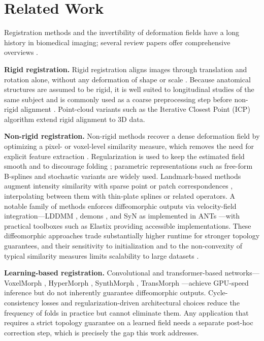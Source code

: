 \section{Related Work}
\label{sec:related_work}

Registration methods and the invertibility of deformation fields \cite{Dupuis1998} have a long history in biomedical imaging; several review papers offer comprehensive overviews \cite{KLEIN2009786}.

\textbf{Rigid registration.}
Rigid registration aligns images through translation and rotation alone, without any deformation of shape or scale \cite{Zhang1994IterativePM}. Because anatomical structures are assumed to be rigid, it is well suited to longitudinal studies of the same subject \cite{REUTER20101181} and is commonly used as a coarse preprocessing step before non-rigid alignment \cite{Frackowiak2004-yy}. Point-cloud variants such as the Iterative Closest Point (ICP) algorithm \cite{Zhang1994IterativePM} extend rigid alignment to 3D data.

\textbf{Non-rigid registration.}
Non-rigid methods recover a dense deformation field by optimizing a pixel- or voxel-level similarity measure, which removes the need for explicit feature extraction \cite{regreviewsong}. Regularization is used to keep the estimated field smooth and to discourage folding \cite{Reithmeir2024}; parametric representations such as free-form B-splines \cite{Rueckert1999} and stochastic variants \cite{Tustison2009} are widely used. Landmark-based methods \cite{MAINTZ19981, ZITOVA2003977} augment intensity similarity with sparse point or patch correspondences \cite{Ourselin2000BlockMA, PatchBasedRegistration}, interpolating between them with thin-plate splines \cite{Sun2011} or related operators. A notable family of methods enforces diffeomorphic outputs via velocity-field integration---LDDMM \cite{Beg2005}, demons \cite{THIRION1998243, VERCAUTEREN2009S61}, and SyN as implemented in ANTs \cite{AVANTS200826}---with practical toolboxes such as Elastix \cite{Klein2010elastixAT} providing accessible implementations. These diffeomorphic approaches trade substantially higher runtime for stronger topology guarantees, and their sensitivity to initialization and to the non-convexity of typical similarity measures limits scalability to large datasets \cite{VARNAVAS2015108}.

\textbf{Learning-based registration.}
Convolutional and transformer-based networks---VoxelMorph \cite{VoxelMorph2019}, HyperMorph \cite{Hoopes2021HyperMorph}, SynthMorph \cite{hoffmann2022synthmorph}, TransMorph \cite{CHEN2022102615}---achieve GPU-speed inference but do not inherently guarantee diffeomorphic outputs. Cycle-consistency losses \cite{KIM2021CycleMorph} and regularization-driven architectural choices \cite{Dalca2018, Huang2023} reduce the frequency of folds in practice but cannot eliminate them. Any application that requires a strict topology guarantee on a learned field needs a separate post-hoc correction step, which is precisely the gap this work addresses.

